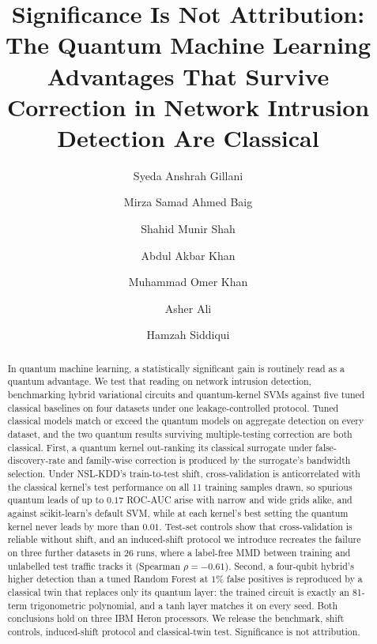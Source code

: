 \documentclass[preprint,11pt]{elsarticle}
\begin{document}
\begin{frontmatter}

\title{Significance Is Not Attribution: The Quantum Machine Learning Advantages
That Survive Correction in Network Intrusion Detection Are Classical}

\author[hei]{Syeda Anshrah Gillani}
\author[fan]{Mirza Samad Ahmed Baig}
\author[sza]{Shahid Munir Shah}
\author[arg]{Abdul Akbar Khan}
\author[fort]{Muhammad Omer Khan}
\author[fan]{Asher Ali}
\author[fan]{Hamzah Siddiqui}
\address[hei]{Heidelberg University, Heidelberg, Germany}
\address[fan]{Fandaqah, Al Khobar, Saudi Arabia}
\address[sza]{Shaheed Zulfiqar Ali Bhutto Institute of Science and Technology, Karachi, Pakistan}
\address[arg]{Argaam Investment, Riyadh, Saudi Arabia}
\address[fort]{Fortanixor, Dubai, United Arab Emirates}

\begin{abstract}
In quantum machine learning, a statistically significant gain is routinely read as a quantum advantage. We
test that reading on network intrusion detection, benchmarking hybrid variational circuits and
quantum-kernel SVMs against five tuned classical baselines on four datasets under one leakage-controlled
protocol. Tuned classical models match or exceed the quantum models on aggregate detection on every dataset, and the two quantum
results surviving multiple-testing correction are both classical. First, a quantum kernel out-ranking
its classical surrogate under false-discovery-rate and family-wise correction is produced by the
surrogate's bandwidth selection. Under NSL-KDD's train-to-test shift, cross-validation is anticorrelated
with the classical kernel's test performance on all 11 training samples drawn, so spurious quantum leads
of up to $0.17$ ROC-AUC arise with narrow and wide grids alike, and against scikit-learn's default SVM,
while at each kernel's best setting the quantum kernel never leads by more than $0.01$. Test-set controls
show that cross-validation is reliable without shift, and an induced-shift protocol we introduce
recreates the failure on three further datasets in 26 runs, where a label-free MMD between training and
unlabelled test traffic tracks it (Spearman $\rho=-0.61$). Second, a four-qubit hybrid's higher detection
than a tuned Random Forest at $1\%$ false positives is reproduced by a classical twin that replaces only
its quantum layer: the trained circuit is exactly an 81-term trigonometric polynomial, and a tanh layer
matches it on every seed. Both conclusions hold on three IBM Heron processors. We release the benchmark,
shift controls, induced-shift protocol and classical-twin test. Significance is not
attribution.
\end{abstract}


\end{frontmatter}
\end{document}
